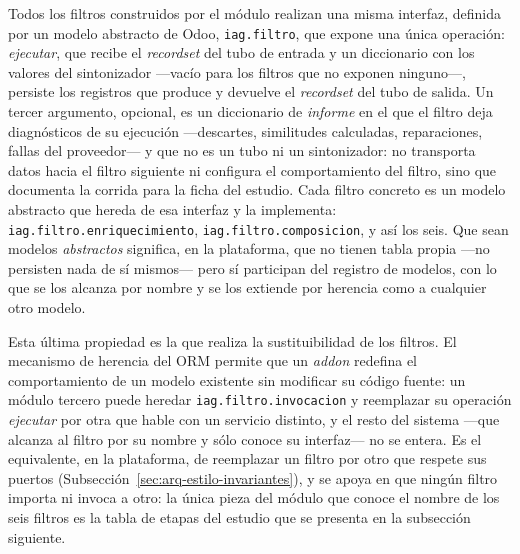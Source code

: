 \documentclass[12pt]{report}
\begin{document}
Todos los filtros construidos por el módulo realizan una misma interfaz, definida por un modelo abstracto de Odoo, \texttt{iag.filtro}, que expone una única operación: \textit{ejecutar}, que recibe el \textit{recordset} del tubo de entrada y un diccionario con los valores del sintonizador ---vacío para los filtros que no exponen ninguno---, persiste los registros que produce y devuelve el \textit{recordset} del tubo de salida. Un tercer argumento, opcional, es un diccionario de \textit{informe} en el que el filtro deja diagnósticos de su ejecución ---descartes, similitudes calculadas, reparaciones, fallas del proveedor--- y que no es un tubo ni un sintonizador: no transporta datos hacia el filtro siguiente ni configura el comportamiento del filtro, sino que documenta la corrida para la ficha del estudio. Cada filtro concreto es un modelo abstracto que hereda de esa interfaz y la implementa: \texttt{iag.filtro.enriquecimiento}, \texttt{iag.filtro.composicion}, y así los seis. Que sean modelos \textit{abstractos} significa, en la plataforma, que no tienen tabla propia ---no persisten nada de sí mismos--- pero sí participan del registro de modelos, con lo que se los alcanza por nombre y se los extiende por herencia como a cualquier otro modelo.

Esta última propiedad es la que realiza la sustituibilidad de los filtros. El mecanismo de herencia del ORM permite que un \textit{addon} redefina el comportamiento de un modelo existente sin modificar su código fuente: un módulo tercero puede heredar \texttt{iag.filtro.invocacion} y reemplazar su operación \textit{ejecutar} por otra que hable con un servicio distinto, y el resto del sistema ---que alcanza al filtro por su nombre y sólo conoce su interfaz--- no se entera. Es el equivalente, en la plataforma, de reemplazar un filtro por otro que respete sus puertos (Subsección~\ref{sec:arq-estilo-invariantes}), y se apoya en que ningún filtro importa ni invoca a otro: la única pieza del módulo que conoce el nombre de los seis filtros es la tabla de etapas del estudio que se presenta en la subsección siguiente.
\end{document}
